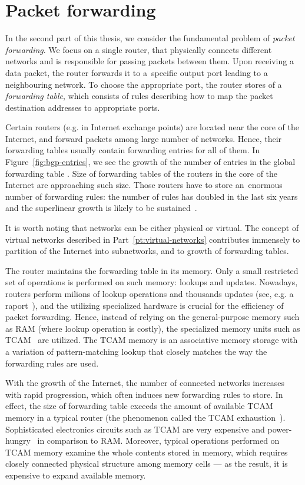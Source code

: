 \section{Packet forwarding}

In the second part of this thesis, we consider the fundamental problem of \emph{packet forwarding}.
We focus on a single router, that physically connects different networks and is responsible for passing packets between them.
Upon receiving a data packet, the router forwards it to a~specific output port leading to a neighbouring network.
To choose the appropriate port, the router stores of a \emph{forwarding table}, which consists of rules describing how to map the packet destination addresses to appropriate ports.

Certain routers (e.g. in Internet exchange points) are located near the core of the Internet, and forward packets among large number of networks.
Hence, their forwarding tables usually contain forwarding entries for all of them.
In Figure~\ref{fig:bgp-entries}, we see the growth of the number of entries in the global forwarding table \cite{url-bgp-entries}.
Size of forwarding tables of the routers in the core of the Internet are approaching such size.
Those routers have to store an~enormous number of forwarding rules: the
number of rules has doubled in the last six years~\cite{bgp-routeviews} and
the superlinear growth is likely to be sustained~\cite{steve-myth}.

It is worth noting that networks can be either physical or virtual.
The concept of virtual networks described in Part~\ref{pt:virtual-networks} contributes immensely to partition of the Internet into subnetworks, and to growth of forwarding tables.


The router maintains the forwarding table in its memory.
Only a small restricted set of operations is performed on such memory: lookups and updates.
Nowadays, routers perform milions of lookup operations and thousands updates (see, e.g. a raport~\cite{bgp-updates}), and the utilizing specialized hardware is crucial for the efficiency of packet forwarding.
Hence, instead of relying on the general-purpose memory such as RAM (where lookup operation is costly), the specialized memory units such as TCAM~\cite{tcam-memory} are utilized.
The TCAM memory is an associative memory storage with a variation of pattern-matching lookup that closely matches the way the forwarding rules are used.

With the growth of the Internet, the number of connected networks increases with rapid progression, which often induces new forwarding rules to store.
In effect, the size of forwarding table exceeds the amount of available TCAM memory in a typical router (the phenomenon called the TCAM exhaustion~\cite{tcam-exhaust}).
Sophisticated electronics circuits such as TCAM are very expensive and power-hungry~\cite{tcam-expensive} in comparison to RAM.
Moreover, typical operations performed on TCAM memory examine the whole contents stored in memory, which requires closely connected physical structure among memory cells --- as the result, it is expensive to expand available memory.

